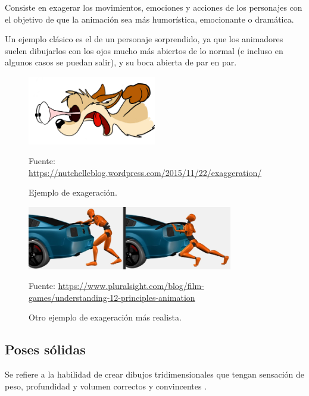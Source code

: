 \documentclass{article}
\begin{document}
Consiste en exagerar los movimientos, emociones y acciones de los personajes con el objetivo de que la animación sea más humorística, emocionante o dramática.

\bigskip

Un ejemplo clásico es el de un personaje sorprendido, ya que los animadores suelen dibujarlos con los ojos mucho más abiertos de lo normal (e incluso en algunos casos se puedan salir), y su boca abierta de par en par.

\begin{figure}[H]
    \centering
    \includegraphics[width=0.5\textwidth]{imagenes/080104_eyes.jpg}
    \caption{Ejemplo de exageración.}
    \vspace{10pt}
    \footnotesize{Fuente: \url{https://nutchelleblog.wordpress.com/2015/11/22/exaggeration/}}
\end{figure}

\begin{figure}[H]
    \centering
    \includegraphics[width=0.8\textwidth]{imagenes/Exaggeration.png}
    \caption{Otro ejemplo de exageración más realista.}
    \vspace{10pt}
    \footnotesize{Fuente: \url{https://www.pluralsight.com/blog/film-games/understanding-12-principles-animation}}
\end{figure}

\subsection{Poses sólidas}

Se refiere a la habilidad de crear dibujos tridimensionales que tengan sensación de peso, profundidad y volumen correctos y convincentes \cite{plural}.

\bigskip
\end{document}
